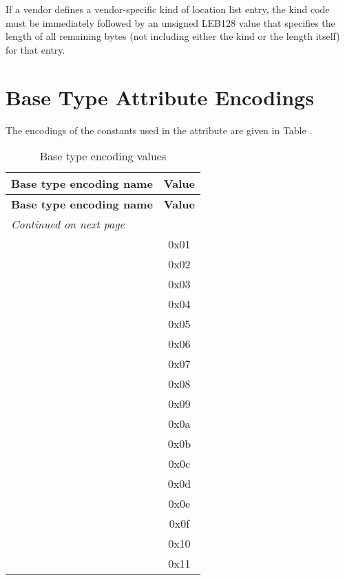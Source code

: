 \bb
If a vendor defines a vendor-specific kind of location 
list entry, the kind code must be immediately followed by an
unsigned LEB128 value that specifies the length of all
remaining bytes (not including either the kind or the length
itself) for that entry.
\eb


\section{Base Type Attribute Encodings}
\label{datarep:basetypeattributeencodings}

The\hypertarget{chap:DWATencodingencodingofbasetype}{}
encodings of the constants used in the 
\DWATencodingDEFN{} attribute 
are given in 
Table .

\begin{centering}
\setlength{\extrarowheight}{0.1cm}
\begin{longtable}{l|c}
  \caption{Base type encoding values} \label{tab:basetypeencodingvalues} \\
  \hline \bfseries Base type encoding name&\bfseries Value \\ \hline
\endfirsthead
  \bfseries Base type encoding name&\bfseries Value\\ \hline
\endhead
  \hline \emph{Continued on next page}
\endfoot
  \hline
  \multicolumn{2}{l}{\ddagnewinversionx} \\
\endlastfoot
\DWATEaddress			& 0x01 \\
\DWATEboolean			& 0x02 \\
\DWATEcomplexfloat		& 0x03 \\
\DWATEfloat				& 0x04 \\
\DWATEsigned			& 0x05 \\
\DWATEsignedchar		& 0x06 \\
\DWATEunsigned			& 0x07 \\
\DWATEunsignedchar		& 0x08 \\
\DWATEimaginaryfloat	& 0x09 \\
\DWATEpackeddecimal		& 0x0a \\
\DWATEnumericstring		& 0x0b \\
\DWATEedited			& 0x0c \\
\DWATEsignedfixed		& 0x0d \\
\DWATEunsignedfixed		& 0x0e \\
\DWATEdecimalfloat 		& 0x0f \\
\DWATEUTF{} 			& 0x10 \\
\DWATEUCS   			& 0x11 \\

\end{longtable}
\end{centering}
